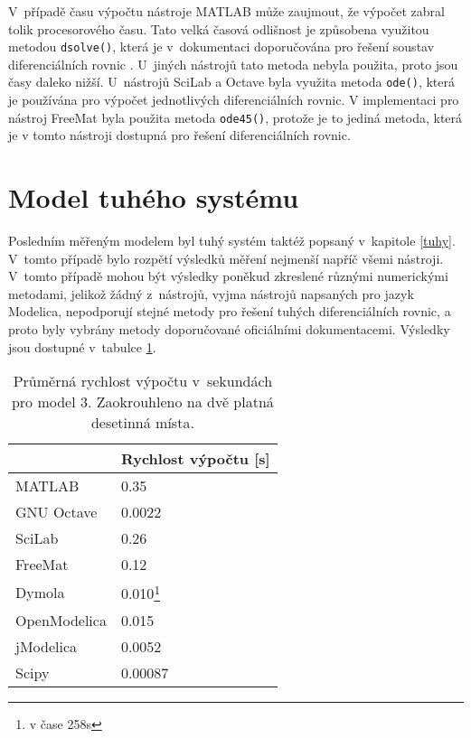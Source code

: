 V~případě času výpočtu nástroje MATLAB může zaujmout, že výpočet zabral tolik procesorového času. Tato velká časová odlišnost je způsobena využitou metodou \texttt{dsolve()}, která je v~dokumentaci doporučována pro řešení soustav diferenciálních rovnic \cite{MATLAB:2010}. U~jiných nástrojů tato metoda nebyla použita, proto jsou časy daleko nižší. U~nástrojů SciLab a Octave byla využita metoda \texttt{ode()}, která je používána pro výpočet jednotlivých diferenciálních rovnic. V implementaci pro nástroj FreeMat byla použita metoda \texttt{ode45()}, protože je to jediná metoda, která je v tomto nástroji dostupná pro řešení diferenciálních rovnic. 



\section{Model tuhého systému}
\label{srovnani-tuhy}
Posledním měřeným modelem byl tuhý systém taktéž popsaný v~kapitole \ref{tuhy}. V~tomto případě bylo rozpětí výsledků měření nejmenší napříč všemi nástroji. V~tomto případě mohou být výsledky poněkud zkreslené různými numerickými metodami, jelikož žádný z~nástrojů, vyjma nástrojů napsaných pro jazyk Modelica, nepodporují stejné metody pro řešení tuhých diferenciálních rovnic, a proto byly vybrány metody doporučované oficiálními dokumentacemi. Výsledky jsou dostupné v~tabulce \ref{tab:tuhy-tabulka}.
\begin{savenotes}
\begin{table}[]
\centering
\begin{tabular}{|l|l|}
\hline
             & Rychlost výpočtu {[}s{]} \\ \hline
MATLAB       &         0.35\\ \hline
GNU Octave   &             0.0022\\ \hline
SciLab       &          0.26\\ \hline
FreeMat &             0.12\\ \hline
Dymola       &        0.010\footnote{v čase 258s}\\ \hline
OpenModelica    &     0.015\\ \hline
jModelica        &    0.0052\\ \hline
 Scipy            &      0.00087\\ \hline
\end{tabular}
\caption{Průměrná rychlost výpočtu v~sekundách pro model 3. Zaokrouhleno na dvě platná desetinná místa.}
\label{tab:tuhy-tabulka}
\end{table}
\end{savenotes}

